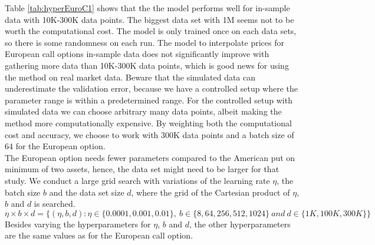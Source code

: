 Table \ref{tab:hyperEuroC1} shows that the the model performs well for in-sample data with 10K-300K data points. The biggest data set with 1M seems not to be worth the computational cost. The model is only trained once on each data sets, so there is some randomness on each run. The model to interpolate prices for European call options in-sample data does not significantly improve with gathering more data than 10K-300K data points, which is good news for using the method on real market data.  Beware that the simulated data can underestimate the validation error, because we have a controlled setup where the parameter range is within a predetermined range. For the controlled setup with simulated data we can choose arbitrary many data points, albeit making the method more computationally expensive. By weighting both the computational cost and accuracy, we choose to work with 300K data points and a batch size of 64 for the European option. \\

The European option needs fewer parameters compared to the American put on minimum of two assets, hence, the data set might need to be larger for that study. We conduct a large grid search with variations of the learning rate $\eta$, the batch size $b$ and the data set size $d$, where the grid of the Cartesian product of $\eta$, $b$ and $d$ is searched.
$$\eta \times b \times d = \{(\eta,b, d) : \eta \in \{0.0001, 0.001, 0.01 \}, \ b \in \{8, 64, 256, 512, 1024\} \ and \ d \in\{1K,100K,300K \} \}$$
Besides varying the hyperparameters for $\eta$, $b$ and $d$, the other hyperparameters are the same values as for the European call option.\\

